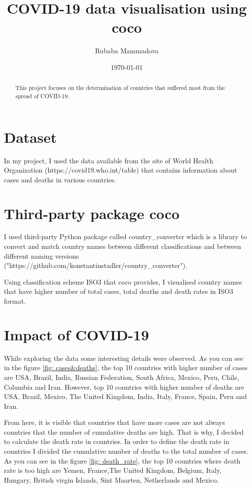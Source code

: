 \documentclass[12pt, letterpaper]{article}
\title{COVID-19 data visualisation using coco}
\author{Rubaba Mammadova}
\date{\today}
\begin{document}
\maketitle

\begin{abstract}
This project focuses on the determination of countries that suffered most from the spread of COVID-19. 
\end{abstract}

\section{Dataset}

In my project, I used the data available from the site of World Health Organization (https://covid19.who.int/table) that contains information about cases and deaths in various countries.

\section{Third-party package coco}

I used third-party Python package called country\_converter which is a library to convert and match country names between different classifications and between different naming versions ("https://github.com/konstantinstadler/country\_converter").

Using classification scheme ISO3 that coco provides, I visualised country names that have higher number of total cases, total deaths and death rates in ISO3 format.
\section{Impact of COVID-19 }

While exploring the data some interesting details were observed. As you can see in the figure \ref{fig: cases&deaths}, the top 10 countries with higher number of cases are USA, Brazil, India, Russian Federation, South Africa, Mexico, Peru, Chile, Columbia and Iran. However, top 10 countries with higher number of deaths are USA, Brazil, Mexico, The United Kingdom, India, Italy, France, Spain, Peru and Iran.

From here, it is visible that countries that have more cases are not always countries that the number of cumulative deaths are high. That is why, I decided to calculate the death rate in countries. In order to define the death rate in countries I divided the cumulative number of deaths to the total number of cases. As you can see in the figure \ref{fig: death_rate}, the top 10 countries where death rate is too high are Yemen, France,The United Kingdom, Belgium, Italy, Hungary, British virgin Islands, Sint Maarten, Netherlands and Mexico. 
\end{document}
